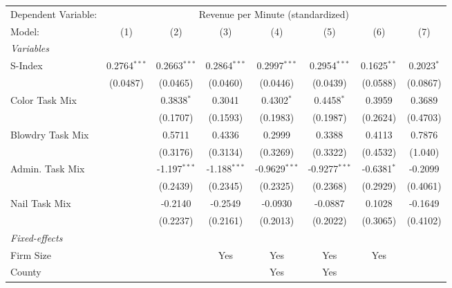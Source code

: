 
\begingroup
\centering
\begin{tabular}{lccccccc}
   \tabularnewline \midrule \midrule
   Dependent Variable: & \multicolumn{7}{c}{Revenue per Minute (standardized)}\\
   Model:           & (1)            & (2)            & (3)            & (4)             & (5)             & (6)           & (7)\\  
   \midrule
   \emph{Variables}\\
   S-Index          & 0.2764$^{***}$ & 0.2663$^{***}$ & 0.2864$^{***}$ & 0.2997$^{***}$  & 0.2954$^{***}$  & 0.1625$^{**}$ & 0.2023$^{*}$\\   
                    & (0.0487)       & (0.0465)       & (0.0460)       & (0.0446)        & (0.0439)        & (0.0588)      & (0.0867)\\   
   Color Task Mix   &                & 0.3838$^{*}$   & 0.3041         & 0.4302$^{*}$    & 0.4458$^{*}$    & 0.3959        & 0.3689\\   
                    &                & (0.1707)       & (0.1593)       & (0.1983)        & (0.1987)        & (0.2624)      & (0.4703)\\   
   Blowdry Task Mix &                & 0.5711         & 0.4336         & 0.2999          & 0.3388          & 0.4113        & 0.7876\\   
                    &                & (0.3176)       & (0.3134)       & (0.3269)        & (0.3322)        & (0.4532)      & (1.040)\\   
   Admin. Task Mix  &                & -1.197$^{***}$ & -1.188$^{***}$ & -0.9629$^{***}$ & -0.9277$^{***}$ & -0.6381$^{*}$ & -0.2099\\   
                    &                & (0.2439)       & (0.2345)       & (0.2325)        & (0.2368)        & (0.2929)      & (0.4061)\\   
   Nail Task Mix    &                & -0.2140        & -0.2549        & -0.0930         & -0.0887         & 0.1028        & -0.1649\\   
                    &                & (0.2237)       & (0.2161)       & (0.2013)        & (0.2022)        & (0.3065)      & (0.4102)\\   
   \midrule
   \emph{Fixed-effects}\\
   Firm Size        &                &                & Yes            & Yes             & Yes             & Yes           & \\  
   County           &                &                &                & Yes             & Yes             &               & \\  

\end{tabular}
